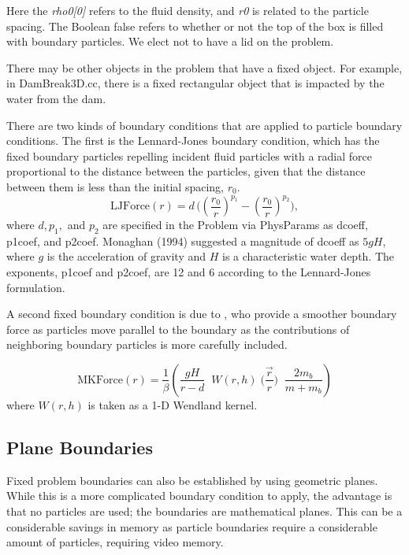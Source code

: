 \documentclass[12pt]{memoir}
\newcommand{\be}{\begin{equation}}
\newcommand{\en}{\end{equation}}
\begin{document}
Here the {\em rho0[0]} refers to the fluid density, and {\em r0} is
related to the particle spacing. The Boolean false refers to whether or
not the top of the box is filled with boundary particles. We elect not
to have a lid on the problem.

There may be other objects in the problem that have a fixed object. For
example, in DamBreak3D.cc, there is a fixed rectangular object that is
impacted by the water from the dam.

There are two kinds of boundary conditions that are applied to particle
boundary conditions. The first is the Lennard-Jones boundary condition,
which has the fixed boundary particles repelling incident fluid
particles with a radial force proportional to the distance between the
particles, given that the distance between them is less than the initial
spacing, $r_0$. \be \mbox{LJForce}(r) = d \, \Big( (
\frac{r_0}{r})^{p_1} - (\frac{r_0}{r})^{p_2}\Big), \en where $d, p_1,$
and $p_2$ are specified in the Problem via PhysParams as dcoeff,
p1coef, and p2coef. Monaghan (1994) suggested a magnitude of dcoeff as
$5 g H$, where $g$ is the acceleration of gravity and $H$ is a
characteristic water depth. The exponents, p1coef and p2coef, are 12
and 6 according to the Lennard-Jones formulation.

A second fixed boundary condition is due to \citet{monaghan_sph_2009}, who
provide a smoother boundary force as particles move parallel to the
boundary as the contributions of neighboring boundary particles is more
carefully included.

\be \mbox{MKForce}(r) = \frac{1}{\beta} \left( \frac{g H}{r-d}\;\;W(r,h)
\; \Big(\frac{\vec{r}}{r}\Big)\; \;\frac{2 m_b}{m + m_b}\right) \en
where $W(r,h)$ is taken as a 1-D Wendland kernel.

\subsection{Plane Boundaries}

Fixed problem boundaries can also be established by using geometric
planes. While this is a more complicated boundary condition to apply,
the advantage is that no particles are used; the boundaries are
mathematical planes. This can be a considerable savings in memory as
particle boundaries require a considerable amount of particles,
requiring video memory.
\end{document}
